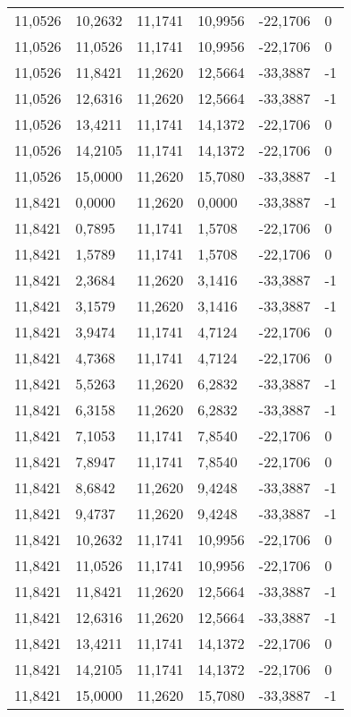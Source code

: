 \begin{longtable}{@{}llllll@{}}
		11,0526 & 10,2632 & 11,1741 & 10,9956 & -22,1706 & 0  \\
		11,0526 & 11,0526 & 11,1741 & 10,9956 & -22,1706 & 0  \\
		11,0526 & 11,8421 & 11,2620 & 12,5664 & -33,3887 & -1 \\
		11,0526 & 12,6316 & 11,2620 & 12,5664 & -33,3887 & -1 \\
		11,0526 & 13,4211 & 11,1741 & 14,1372 & -22,1706 & 0  \\
		11,0526 & 14,2105 & 11,1741 & 14,1372 & -22,1706 & 0  \\
		11,0526 & 15,0000 & 11,2620 & 15,7080 & -33,3887 & -1 \\
		11,8421 & 0,0000  & 11,2620 & 0,0000  & -33,3887 & -1 \\
		11,8421 & 0,7895  & 11,1741 & 1,5708  & -22,1706 & 0  \\
		11,8421 & 1,5789  & 11,1741 & 1,5708  & -22,1706 & 0  \\
		11,8421 & 2,3684  & 11,2620 & 3,1416  & -33,3887 & -1 \\
		11,8421 & 3,1579  & 11,2620 & 3,1416  & -33,3887 & -1 \\
		11,8421 & 3,9474  & 11,1741 & 4,7124  & -22,1706 & 0  \\
		11,8421 & 4,7368  & 11,1741 & 4,7124  & -22,1706 & 0  \\
		11,8421 & 5,5263  & 11,2620 & 6,2832  & -33,3887 & -1 \\
		11,8421 & 6,3158  & 11,2620 & 6,2832  & -33,3887 & -1 \\
		11,8421 & 7,1053  & 11,1741 & 7,8540  & -22,1706 & 0  \\
		11,8421 & 7,8947  & 11,1741 & 7,8540  & -22,1706 & 0  \\
		11,8421 & 8,6842  & 11,2620 & 9,4248  & -33,3887 & -1 \\
		11,8421 & 9,4737  & 11,2620 & 9,4248  & -33,3887 & -1 \\
		11,8421 & 10,2632 & 11,1741 & 10,9956 & -22,1706 & 0  \\
		11,8421 & 11,0526 & 11,1741 & 10,9956 & -22,1706 & 0  \\
		11,8421 & 11,8421 & 11,2620 & 12,5664 & -33,3887 & -1 \\
		11,8421 & 12,6316 & 11,2620 & 12,5664 & -33,3887 & -1 \\
		11,8421 & 13,4211 & 11,1741 & 14,1372 & -22,1706 & 0  \\
		11,8421 & 14,2105 & 11,1741 & 14,1372 & -22,1706 & 0  \\
		11,8421 & 15,0000 & 11,2620 & 15,7080 & -33,3887 & -1 \\

\end{longtable}

